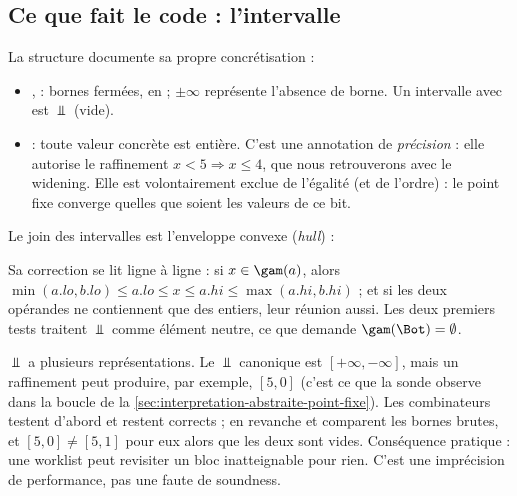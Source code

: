 \subsection{Ce que fait le code : l'intervalle}

La structure  documente sa propre concrétisation :


\begin{itemize}
  \item {},  : bornes fermées, en  ; $\pm\infty$
    représente l'absence de borne. Un intervalle avec  est
    $\Bot$ (vide).
  \item {} : \og toute valeur concrète est entière\fg{}. C'est une
    annotation de \emph{précision} : elle autorise le raffinement
    $x < 5 \Rightarrow x \le 4$, que nous retrouverons avec le widening. Elle
    est volontairement exclue de l'égalité (et de l'ordre) : le point fixe
    converge quelles que soient les valeurs de ce bit.
\end{itemize}

Le join des intervalles est l'enveloppe convexe (\emph{hull}) :


Sa correction se lit ligne à ligne : si $x \in \gam(a)$, alors
$\min(a.lo, b.lo) \le a.lo \le x \le a.hi \le \max(a.hi, b.hi)$ ; et si les deux
opérandes ne contiennent que des entiers, leur réunion aussi. Les deux premiers
tests traitent $\Bot$ comme élément neutre, ce que demande
$\gam(\Bot) = \emptyset$.

\begin{piege}
  $\Bot$ a plusieurs représentations. Le $\Bot$ canonique est
  $[+\infty, -\infty]$, mais un raffinement peut produire, par exemple,
  $[5, 0]$ (c'est ce que la sonde  observe dans la boucle de la
  \cref{sec:interpretation-abstraite-point-fixe}). Les combinateurs testent
   d'abord et restent corrects ; en revanche
   et  comparent les bornes brutes, et
  $[5,0] \neq [5,1]$ pour eux alors que les deux sont vides. Conséquence
  pratique : une worklist peut revisiter un bloc inatteignable pour rien.
  C'est une imprécision de performance, pas une faute de soundness.
\end{piege}


